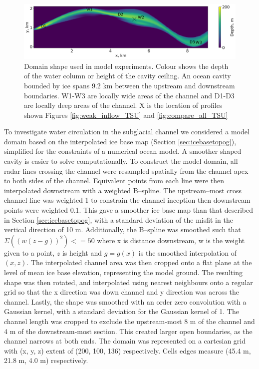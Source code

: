 \begin{figure}[!ht]
\centering
\includegraphics[width=1\textwidth]{chapters/4/domain.png}
\caption[Domain]{Domain shape used in model experiments. Colour shows the depth of the water column or height of the cavity ceiling. An ocean cavity bounded by ice spans 9.2 km between the upstream and downstream boundaries. W1-W3 are locally wide areas of the channel and D1-D3 are locally deep areas of the channel. X is the location of profiles shown Figures \ref{fig:weak_inflow_TSU} and \ref{fig:compare_all_TSU} }
\label{fig:domain}
\end{figure}

To investigate water circulation in the subglacial channel we considered a model domain based on the interpolated ice base map (Section \ref{sec:icebasetopog}), simplified for the constraints of a numerical ocean model.  A smoother shaped cavity is easier to solve computationally.
To construct the model domain, all radar lines crossing the channel were resampled spatially from the channel apex to both sides of the channel. Equivalent points from each line were then interpolated downstream with a weighted B--spline. The upstream--most cross channel line was weighted 1 to constrain the channel inception then downstream points were weighted 0.1. This gave a smoother ice base map than that described in Section \ref{sec:icebasetopog}, with a standard deviation of the misfit in the vertical direction of 10 m.  Additionally, the B--spline was smoothed such that $ \Sigma ((w  (z - g))^2) <= 50 $ where x is distance downstream, w is the weight given to a point, $z$ is height and $g=g(x)$ is the smoothed interpolation of $(x,z)$.
The interpolated channel area was then cropped onto a flat plane at the level of mean ice base elevation, representing the model ground. The resulting shape was then rotated, and interpolated using nearest neighbours onto a regular grid so that the x direction was down channel and y direction was across the channel. Lastly, the shape was smoothed with an order zero convolution with a Gaussian kernel, with a standard deviation for the Gaussian kernel of 1.
The channel length was cropped to exclude the upstream-most 8 m of the channel and 4 m of the downstream-most section. This created larger open boundaries, as the channel narrows at both ends.
The domain was represented on a cartesian grid with (x, y, z) extent of (200, 100, 136) respectively. Cells edges measure (45.4 m, 21.8 m, 4.0 m)  respectively.

